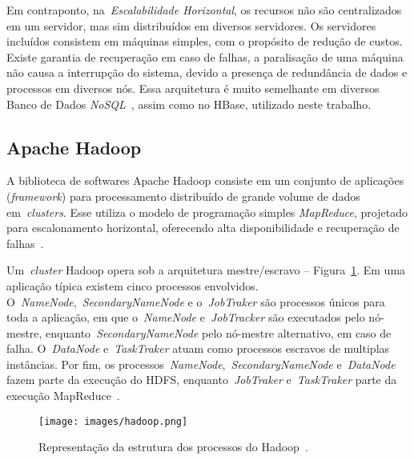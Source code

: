 \documentclass[12pt]{article}
\begin{document}
Em contraponto, na~\emph{Escalabilidade Horizontal}, os recursos não são centralizados em um servidor, mas sim distribuídos em diversos servidores. Os servidores incluídos consistem em máquinas simples, com o propósito de redução de custos. Existe garantia de recuperação em caso de falhas, a paralisação de uma máquina não causa a interrupção do sistema, devido a presença de redundância de dados e processos em diversos nós. Essa arquitetura é muito semelhante em diversos Banco de Dados \textit{NoSQL}~\cite{hwang2014scale}, assim como no HBase, utilizado neste trabalho.

\subsection{Apache Hadoop}
\label{subsection:hadoop}

A biblioteca de softwares Apache Hadoop consiste em um conjunto de aplicações (\textit{framework}) para processamento distribuído de grande volume de dados em~\emph{clusters}. Esse utiliza o modelo de programação simples \emph{MapReduce}, projetado para escalonamento horizontal, oferecendo alta disponibilidade e recuperação de falhas~\cite{hadoophbase}. %

Um~\emph{cluster} Hadoop opera sob a arquitetura mestre/escravo -- Figura~\ref{figure:hadoop}. Em uma aplicação típica existem cinco processos envolvidos. O~\emph{NameNode},~\emph{SecondaryNameNode} e o~\emph{JobTraker} são processos únicos para toda a aplicação, em que o~\emph{NameNode} e~\emph{JobTracker} são executados pelo nó-mestre, enquanto~\emph{SecondaryNameNode} pelo nó-mestre alternativo, em caso de falha. O~\emph{DataNode} e~\emph{TaskTraker} atuam como processos escravos de multiplas instâncias. Por fim, os processos~\emph{NameNode},~\emph{SecondaryNameNode} e~\emph{DataNode} fazem parte da execução do HDFS, enquanto~\emph{JobTraker} e~\emph{TaskTraker} parte da execução MapReduce~\cite{goldman2012apache}.

\begin{figure}[!ht]
\texttt{[image: images/hadoop.png]}
\caption{Representação da estrutura dos processos do Hadoop~\cite{goldman2012apache}.}
\label{figure:hadoop}
\end{figure}
\end{document}
